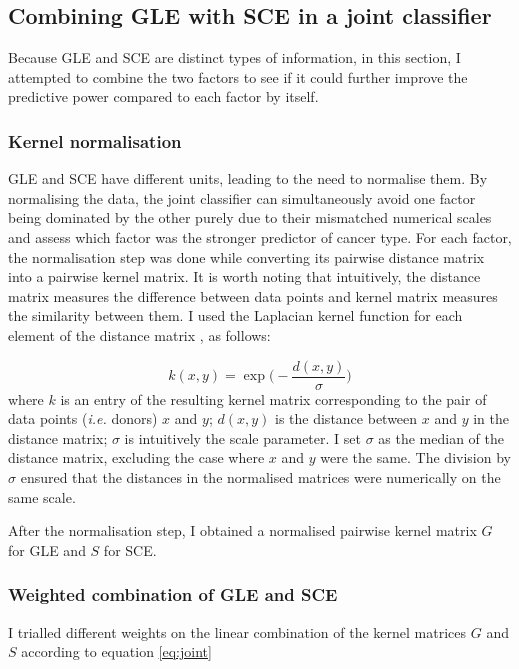 

\subsection{Combining GLE with SCE in a joint classifier}\label{methods:ml_both}
Because GLE and SCE are distinct types of information, in this section, I attempted to combine the two factors to see if it could further improve the predictive power compared to each factor by itself.

\subsubsection{Kernel normalisation}
GLE and SCE have different units, leading to the need to normalise them. By normalising the data, the joint classifier can simultaneously avoid one factor being dominated by the other purely due to their mismatched numerical scales and assess which factor was the stronger predictor of cancer type. For each factor, the normalisation step was done while converting its pairwise distance matrix into a pairwise kernel matrix. It is worth noting that intuitively, the distance matrix measures the difference between data points and kernel matrix measures the similarity between them. I used the Laplacian kernel function for each element of the distance matrix \citep{Wang2016ApplicationFunction}, as follows:

\begin{equation}
    k(x,y) = \exp\bigg( - \frac{d(x,y)}{\sigma}\bigg)
    \label{eq:laplacian}
\end{equation}
where $k$ is an entry of the resulting kernel matrix corresponding to the pair of data points (\textit{i.e.} donors) $x$ and $y$; $d(x,y)$ is the distance between $x$ and $y$ in the distance matrix; $\sigma$ is intuitively the scale parameter. I set $\sigma$ as the median of the distance matrix, excluding the case where $x$ and $y$ were the same. The division by $\sigma$ ensured that the distances in the normalised matrices were numerically on the same scale.

After the normalisation step, I obtained a normalised pairwise kernel matrix $G$ for GLE and $S$ for SCE.

\subsubsection{Weighted combination of GLE and SCE}
I trialled different weights on the linear combination of the kernel matrices $G$ and $S$ according to equation \ref{eq:joint}

